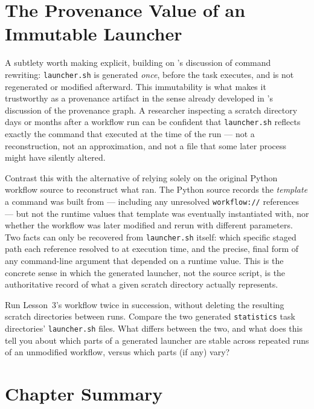 \section{The Provenance Value of an Immutable Launcher}

A subtlety worth making explicit, building on 's discussion
of command rewriting: \texttt{launcher.sh} is generated \emph{once}, before
the task executes, and is not regenerated or modified afterward. This
immutability is what makes it trustworthy as a provenance artifact in the
sense already developed in 's discussion of the provenance
graph. A researcher inspecting a scratch directory days or months after a
workflow run can be confident that \texttt{launcher.sh} reflects exactly the
command that executed at the time of the run --- not a reconstruction, not
an approximation, and not a file that some later process might have
silently altered.

Contrast this with the alternative of relying solely on the original Python
workflow source to reconstruct what ran. The Python source records the
\emph{template} a command was built from --- including any unresolved
\texttt{workflow://} references --- but not the runtime values that
template was eventually instantiated with, nor whether the workflow was
later modified and rerun with different parameters. Two facts can only be
recovered from \texttt{launcher.sh} itself: which specific staged path each
reference resolved to at execution time, and the precise, final form of any
command-line argument that depended on a runtime value. This is the concrete
sense in which the generated launcher, not the source script, is the
authoritative record of what a given scratch directory actually represents.

\begin{exercise}
Run Lesson~3's workflow twice in succession, without deleting the resulting
scratch directories between runs. Compare the two generated
\texttt{statistics} task directories' \texttt{launcher.sh} files. What
differs between the two, and what does this tell you about which parts of a
generated launcher are stable across repeated runs of an unmodified
workflow, versus which parts (if any) vary?
\end{exercise}

\section{Chapter Summary}

